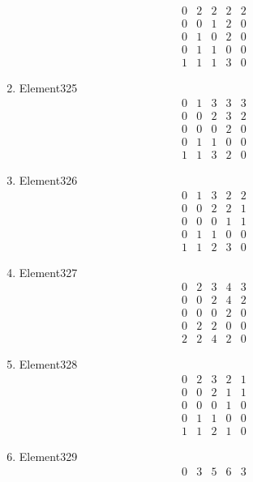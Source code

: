 \documentclass[12pt]{article}
\begin{document}
\begin{multicols}{3}
\begin{enumerate}
\begin{equation*}
\begin{array}{ccccc}
0&2&2&2&2\\
0&0&1&2&0\\
0&1&0&2&0\\
0&1&1&0&0\\
1&1&1&3&0
\end{array}
\end{equation*}
\item Element325
\begin{equation*}
\begin{array}{ccccc}
0&1&3&3&3\\
0&0&2&3&2\\
0&0&0&2&0\\
0&1&1&0&0\\
1&1&3&2&0
\end{array}
\end{equation*}
\item Element326
\begin{equation*}
\begin{array}{ccccc}
0&1&3&2&2\\
0&0&2&2&1\\
0&0&0&1&1\\
0&1&1&0&0\\
1&1&2&3&0
\end{array}
\end{equation*}
\item Element327
\begin{equation*}
\begin{array}{ccccc}
0&2&3&4&3\\
0&0&2&4&2\\
0&0&0&2&0\\
0&2&2&0&0\\
2&2&4&2&0
\end{array}
\end{equation*}
\item Element328
\begin{equation*}
\begin{array}{ccccc}
0&2&3&2&1\\
0&0&2&1&1\\
0&0&0&1&0\\
0&1&1&0&0\\
1&1&2&1&0
\end{array}
\end{equation*}
\item Element329
\begin{equation*}
\begin{array}{ccccc}
0&3&5&6&3\\

\end{array}
\end{equation*}
\end{enumerate}
\end{multicols}
\end{document}
